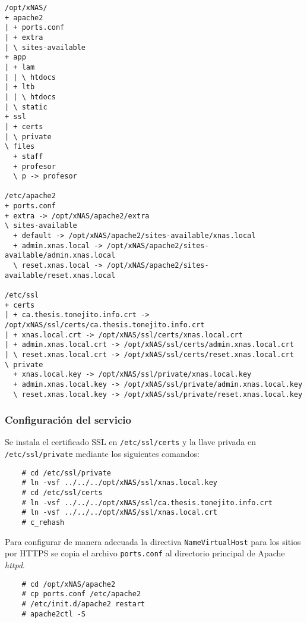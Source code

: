 {
\scriptsize
\linespread{1}
\begin{verbatim}
/opt/xNAS/
+ apache2
| + ports.conf
| + extra
| \ sites-available
+ app
| + lam
| | \ htdocs
| + ltb
| | \ htdocs
| \ static
+ ssl
| + certs
| \ private
\ files
  + staff
  + profesor
  \ p -> profesor

/etc/apache2
+ ports.conf
+ extra -> /opt/xNAS/apache2/extra
\ sites-available
  + default -> /opt/xNAS/apache2/sites-available/xnas.local
  + admin.xnas.local -> /opt/xNAS/apache2/sites-available/admin.xnas.local
  \ reset.xnas.local -> /opt/xNAS/apache2/sites-available/reset.xnas.local

/etc/ssl
+ certs
| + ca.thesis.tonejito.info.crt -> /opt/xNAS/ssl/certs/ca.thesis.tonejito.info.crt
| + xnas.local.crt -> /opt/xNAS/ssl/certs/xnas.local.crt
| + admin.xnas.local.crt -> /opt/xNAS/ssl/certs/admin.xnas.local.crt
| \ reset.xnas.local.crt -> /opt/xNAS/ssl/certs/reset.xnas.local.crt
\ private
  + xnas.local.key -> /opt/xNAS/ssl/private/xnas.local.key
  + admin.xnas.local.key -> /opt/xNAS/ssl/private/admin.xnas.local.key
  \ reset.xnas.local.key -> /opt/xNAS/ssl/private/reset.xnas.local.key
\end{verbatim}
}

        \subsubsection {Configuraci\'{o}n del servicio}

Se instala el certificado \textsc{SSL} en \texttt{/etc/ssl/certs} y la llave privada en \texttt{/etc/ssl/private} mediante los siguientes comandos:

{
\scriptsize
\linespread{1}
\begin{verbatim}
    # cd /etc/ssl/private
    # ln -vsf ../../../opt/xNAS/ssl/xnas.local.key
    # cd /etc/ssl/certs
    # ln -vsf ../../../opt/xNAS/ssl/ca.thesis.tonejito.info.crt
    # ln -vsf ../../../opt/xNAS/ssl/xnas.local.crt
    # c_rehash
\end{verbatim}
}

Para configurar de manera adecuada la directiva \texttt{NameVirtualHost} para los sitios por \textsc{HTTPS} se copia el archivo \texttt{ports.conf} al directorio principal de Apache \textit{httpd}.

{
\scriptsize
\linespread{1}
\begin{verbatim}
    # cd /opt/xNAS/apache2
    # cp ports.conf /etc/apache2
    # /etc/init.d/apache2 restart
    # apache2ctl -S
\end{verbatim}
}

